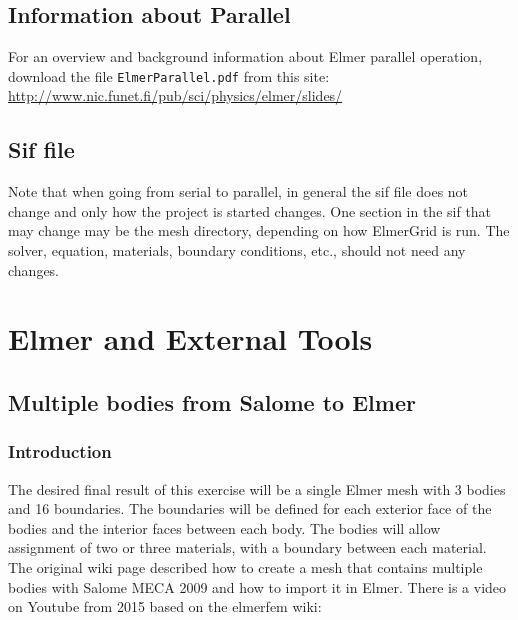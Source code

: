 \section{Information about Parallel}

For an overview and background information about Elmer parallel operation, download the file \texttt{ElmerParallel.pdf} from this site:\\

\url{http://www.nic.funet.fi/pub/sci/physics/elmer/slides/}


\section{Sif file}

Note that when going from serial to parallel, in general the sif file does not change and only how the project is started changes.  One section in the sif that may change may be the mesh directory, depending on how ElmerGrid is run.  The solver, equation, materials, boundary conditions, etc., should not need any changes.


\chapter{Elmer and External Tools}

\section{Multiple bodies from Salome to Elmer}

\subsection{Introduction}

The desired final result of this exercise will be a single Elmer mesh with 3 bodies and 16 boundaries.  The boundaries will be defined for each exterior face of the bodies and the interior faces between each body.  The bodies will allow assignment of two or three materials, with a boundary between each material.\\

The original wiki page described how to create a mesh that contains multiple bodies with Salome MECA 2009 and how to import it in Elmer.  There is a video on Youtube from 2015 based on the elmerfem wiki:\\

